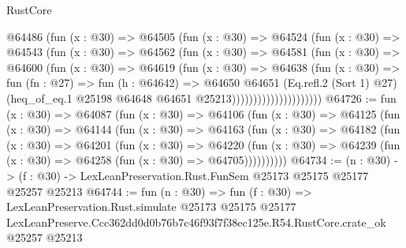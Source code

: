 \begin{lexlean}{RustCore}
\begin{coremodule}
                        @64486
                          (fun (x : @30) =>
                          @64505
                            (fun (x : @30) =>
                            @64524
                              (fun (x : @30) =>
                              @64543
                                (fun (x : @30) =>
                                @64562
                                  (fun (x : @30) =>
                                  @64581
                                    (fun (x : @30) =>
                                    @64600
                                      (fun (x : @30) =>
                                      @64619
                                        (fun (x : @30) =>
                                        @64638
                                          (fun (x : @30) =>
                                          fun (fn : @27) =>
                                          fun (h : @64642) =>
                                          @64650
                                            @64651
                                            (Eq.refl.{2} (Sort 1) @27)
                                            (heq_of_eq.{1}
                                              @25198
                                              @64648
                                              @64651
                                              @25213)))))))))))))))))))))
@64726 := fun (x : @30) =>
  @64087
    (fun (x : @30) =>
    @64106
      (fun (x : @30) =>
      @64125
        (fun (x : @30) =>
        @64144
          (fun (x : @30) =>
          @64163
            (fun (x : @30) =>
            @64182
              (fun (x : @30) =>
              @64201
                (fun (x : @30) =>
                @64220
                  (fun (x : @30) =>
                  @64239 (fun (x : @30) => @64258 (fun (x : @30) => @64705))))))))))
@64734 := (n : @30) ->
  (f : @30) -> LexLeanPreservation.Rust.FunSem @25173 @25175 @25177 @25257 @25213
@64744 := fun (n : @30) =>
  fun (f : @30) =>
  LexLeanPreservation.Rust.simulate
    @25173
    @25175
    @25177
    LexLeanPreserve.Ccc362dd0d0b76b7c46f93f7f38ec125e.R54.RustCore.crate_ok
    @25257
    @25213
\end{coremodule}
\end{lexlean}
